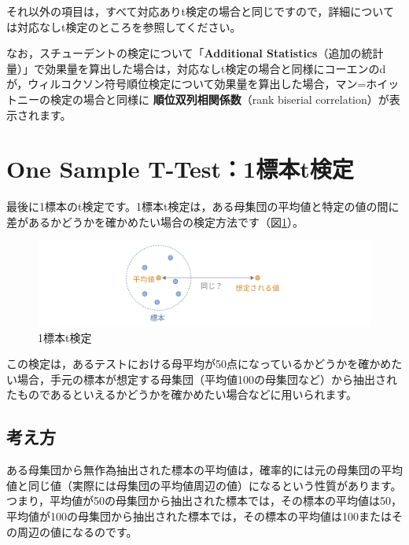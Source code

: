 \documentclass[
  12pt,
  a5jpaper,
  lualatex, ja=standard]{bxjsbook}
\renewcommand{\emph}[1]{\textbf{\color{emph} #1}}
\begin{document}
それ以外の項目は，すべて対応ありt検定の場合と同じですので，詳細については対応なしt検定のところを参照してください。

なお，スチューデントの検定について「\textbf{Additional Statistics}（追加の統計量）」で効果量を算出した場合は，対応なしt検定の場合と同様にコーエンのdが，ウィルコクソン符号順位検定について効果量を算出した場合，マン=ホイットニーの検定の場合と同様に\emph{順位双列相関係数}（rank biserial correlation）が表示されます。

\hypertarget{sec:ttests-one}{%
\section{One Sample T-Test：1標本t検定}\label{sec:ttests-one}}

最後に1標本のt検定です。1標本t検定は，ある母集団の平均値と特定の値の間に差があるかどうかを確かめたい場合の検定方法です（図\ref{fig:ttests-one-sample}）。

\begin{figure}[!ht]

{\centering \includegraphics[width=1\linewidth]{images/ttests/one-sample} 

}

\caption{1標本t検定}\label{fig:ttests-one-sample}
\end{figure}

この検定は，あるテストにおける母平均が50点になっているかどうかを確かめたい場合，手元の標本が想定する母集団（平均値100の母集団など）から抽出されたものであるといえるかどうかを確かめたい場合などに用いられます。

\hypertarget{subsec:ttests-one-basics}{%
\subsection{考え方}\label{subsec:ttests-one-basics}}

ある母集団から無作為抽出された標本の平均値は，確率的には元の母集団の平均値と同じ値（実際には母集団の平均値周辺の値）になるという性質があります。つまり，平均値が50の母集団から抽出された標本では，その標本の平均値は50，平均値が100の母集団から抽出された標本では，その標本の平均値は100またはその周辺の値になるのです。
\end{document}
